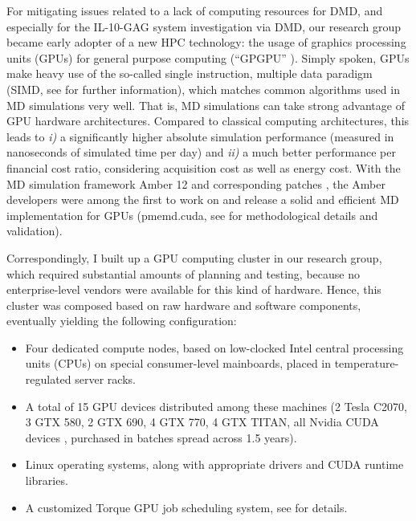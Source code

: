 For mitigating issues related to a lack of computing resources for DMD, and
especially for the IL-10-GAG system investigation via DMD, our research group
became early adopter of a new HPC technology: the usage of graphics processing
units (GPUs) for general purpose computing (\enquote{GPGPU}
\cite{wikipedia_gpgpu}). Simply spoken, GPUs make heavy use of the so-called
single instruction, multiple data paradigm (SIMD, see
\cite{kirk2012programming_gpus} for further information), which matches common
algorithms used in MD simulations very well. That is, MD simulations can take
strong advantage of GPU hardware architectures. Compared to classical computing
architectures, this leads to \textit{i)} a significantly higher absolute
simulation performance (measured in nanoseconds of simulated time per day) and
\textit{ii)} a much better performance per financial cost ratio, considering
acquisition cost as well as energy cost. With the MD simulation framework Amber
12 \cite{case_amber_12} and corresponding patches
\cite{amber_12_patches}, the Amber developers were among the first to work on
and release a solid and efficient MD implementation for GPUs (pmemd.cuda, see
\cite{amber_gpu_2012,amber_gpu_pme_2013} for methodological details and
validation).

Correspondingly, I built up a GPU computing cluster in our research group, which
required substantial amounts of planning and testing, because no
enterprise-level vendors were available for this kind of hardware. Hence, this
cluster was composed based on raw hardware and software components, eventually
yielding the following configuration:

\begin{itemize}
\item Four dedicated compute nodes, based on low-clocked Intel central
processing units (CPUs) on special consumer-level mainboards, placed in
temperature-regulated server racks.
\item A total of 15 GPU devices distributed among these machines (2 Tesla C2070,
3 GTX 580, 2 GTX 690, 4 GTX 770, 4 GTX TITAN, all Nvidia CUDA devices
\cite{nvidia_cuda_devices}, purchased in batches spread across 1.5 years).
\item Linux operating systems, along with appropriate drivers and CUDA runtime
libraries.
\item A customized Torque \cite{torque_website} GPU job scheduling system, see
\cite{gehrcke_torque_gpu_setup} for details.
\end{itemize}

